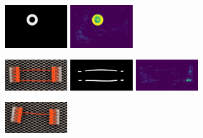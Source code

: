 \begin{figure}[H]
\begin{subfigure}[b]{\textwidth}
\begin{minipage}{0.45\textwidth}
            \includegraphics[width=0.3\textwidth]{figures/appendix/appendix_DRAEM/SB/337_m.png}
            \includegraphics[width=0.3\textwidth]{figures/appendix/appendix_DRAEM/SB/337_mask.png}
        \end{minipage}
    \end{subfigure}
    \hfill
    \begin{subfigure}[b]{\textwidth}
        \centering
        \begin{minipage}{0.45\textwidth}
            \centering
            \includegraphics[width=0.3\textwidth]{figures/appendix/appendix_DRAEM/SC/175.png}
            \includegraphics[width=0.3\textwidth]{figures/appendix/appendix_DRAEM/SC/175m.png}
            \includegraphics[width=0.3\textwidth]{figures/appendix/appendix_DRAEM/SC/175_mask.png}
        \end{minipage}
        \begin{minipage}{0.45\textwidth}
            \centering
            \includegraphics[width=0.3\textwidth]{figures/appendix/appendix_DRAEM/SC/237.png}

\end{minipage}
\end{subfigure}
\end{figure}
